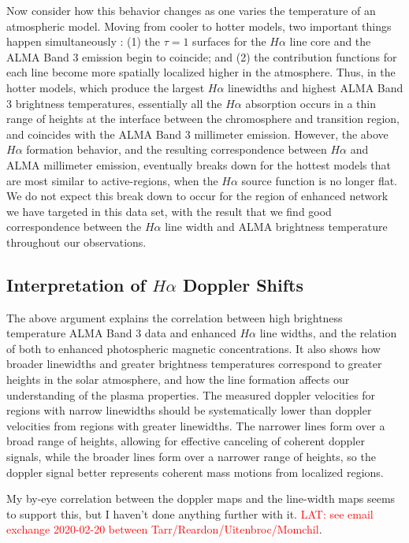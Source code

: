 \documentclass[twocolumn]{aastex62}
\newcommand{\halpha}{\ensuremath{H\alpha}}
\newcommand{\latcomment}[1]{\textcolor{red}{LAT: #1}}
\begin{document}
Now consider how this behavior changes as one varies the temperature of an atmospheric model.  Moving from cooler to hotter models, two important things happen simultaneously \citep[see][Fig.~5]{2019Molnar}: (1) the $\tau=1$ surfaces for the \halpha{} line core and the ALMA Band 3 emission begin to coincide; and (2) the contribution functions for each line become more spatially localized higher in the atmosphere.  Thus, in the hotter models, which produce the largest \halpha{} linewidths and highest ALMA Band 3 brightness temperatures, essentially all the \halpha{} absorption occurs in a thin range of heights at the interface between the chromosphere and transition region, and coincides with the ALMA Band 3 millimeter emission.  However, the above \halpha{} formation behavior, and the resulting correspondence between \halpha{} and ALMA millimeter emission, eventually breaks down for the hottest models that are most similar to active-regions, when the \halpha{} source function is no longer flat.  We do not expect this break down to occur for the region of enhanced network we have targeted in this data set, with the result that we find good correspondence between the \halpha{} line width and ALMA brightness temperature throughout our observations.
\subsection{Interpretation of \halpha{} Doppler Shifts}

The above argument explains the correlation between high brightness temperature ALMA Band 3 data and enhanced \halpha{} line widths, and the relation of both to enhanced photospheric magnetic concentrations.  It also shows how broader linewidths and greater brightness temperatures correspond to greater heights in the solar atmosphere, and how the line formation affects our understanding of the plasma properties.  The measured doppler velocities for regions with narrow linewidths should be systematically lower than doppler velocities from regions with greater linewidths.  The narrower lines form over a broad range of heights, allowing for effective canceling of coherent doppler signals, while the broader lines form over a narrower range of heights, so the doppler signal better represents coherent mass motions from localized regions. 
 
My by-eye correlation between the doppler maps and the line-width maps seems to support this, but I haven’t done anything further with it.
\latcomment{see email exchange 2020-02-20 between Tarr/Reardon/Uitenbroc/Momchil}.
 
\end{document}
